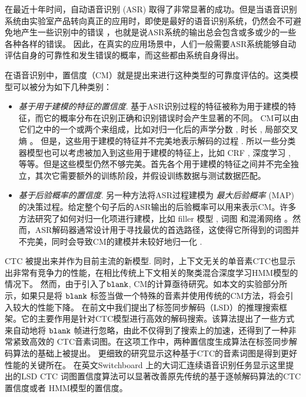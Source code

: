 在最近十年时间，自动语音识别 (ASR) 取得了非常显著的成功。但是当语音识别系统由实验室产品转向真正的应用时，即使是最好的语音识别系统，仍然会不可避免地产生一些识别中的错误 \cite{ruan2016speech}，也就是说ASR系统的输出总会包含或多或少的一些各种各样的错误。
因此，在真实的应用场景中，人们一般需要ASR系统能够自动评估自身的可靠性和发生错误的概率，而这些都由系统自身得出。

在语音识别中，置信度（CM）就是提出来进行这种类型的可靠度评估的\cite{jiang2005confidence}。这类模型可以被分为如下几种类别：

\begin{itemize}
    \item {\em 基于用于建模的特征的置信度}.
    基于ASR识别过程的特征被称为用于建模的特征，而它的概率分布在识别正确和识别错误时会产生显著的不同。
    CM可以由它们之中的一个或两个来组成，比如对归一化后的声学分数 \cite{hu2013new}, 时长 \cite{ma2011fusing}, 局部交叉熵 \cite{falavigna2002acoustic}。
    但是，这些用于建模的特征并不完美地表示解码的过程 \cite{jiang2005confidence}. 所以一些分类器模型也可以考虑被加入到这些用于建模的特征上，比如 CRF \cite{seigel2013confidence}, 深度学习 \cite{yu2011calibration}, 等等。但是这些模型仍然不够完美。首先各个用于建模的特征之间并不完全独立，其次它需要额外的训练阶段，并假设训练数据与测试数据匹配。

    \item {\em 基于后验概率的置信度}.
    另一种方法将ASR过程建模为 {\em 最大后验概率} (MAP) 的决策过程。给定整个句子后的ASR输出的后验概率可以用来表示CM。许多方法研究了如何对归一化项进行建模，比如 filler 模型 \cite{young1994detecting}, 词图\cite{wessel2001confidence} 和混淆网络 \cite{evermann2000large}。然而，ASR解码器通常设计用于寻找最优的首选路径，这使得它所得到的词图并不完美，同时会导致CM的建模并未较好地归一化 \cite{yu2006maximum}.

\end{itemize}

CTC\cite{graves2006connectionist} 被提出来并作为目前主流的新模型\cite{fernandez2008phoneme}\cite{sainath2015acoustic}\cite{amodei2015deep}\cite{sak2015fast}.
同时，上下文无关的单音素CTC也显示出非常有竞争力的性能，在相比传统上下文相关的聚类混合深度学习HMM模型\cite{sak2015fast}\cite{miao2015eesen}\cite{miao2016ctc}\cite{mcgraw2016personalized}的情况下。
然而，由于引入了$\tt blank$, CM的计算亟待研究。如本文的实验部分所示，如果只是将 $\tt blank$ 标签当做一个特殊的音素并使用传统的CM方法，将会引入较大的性能下降。
在前文中我们提出了标签同步解码（LSD）的推理搜索框架。它的主要作用是针对CTC模型进行高效的解码搜索。该算法提出了一些方式来自动地将 $\tt blank$ 帧进行忽略，由此不仅得到了搜索上的加速，还得到了一种非常紧致高效的 CTC音素词图。在这项工作中，两种置信度生成算法在标签同步解码算法的基础上被提出。
更细致的研究显示这种基于CTC的音素词图是得到更好性能的关键所在。
在英文Switchboard 上的大词汇连续语音识别任务显示这里提出的LSD CTC 词图置信度算法可以显著改善原先传统的基于逐帧解码算法的CTC置信度或者 HMM模型的置信度。


